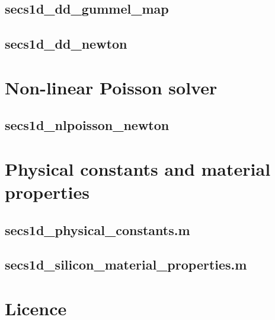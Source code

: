 \documentclass[9pt]{amsart}
\begin{document}
\subsection{secs1d\_dd\_gummel\_map}


\subsection{secs1d\_dd\_newton}


\section{Non-linear Poisson solver}
\subsection{secs1d\_nlpoisson\_newton}


\section{Physical constants and material properties}
\subsection{secs1d\_physical\_constants.m}


\subsection{secs1d\_silicon\_material\_properties.m}


\appendix
\section{Licence}


 
\end{document}
